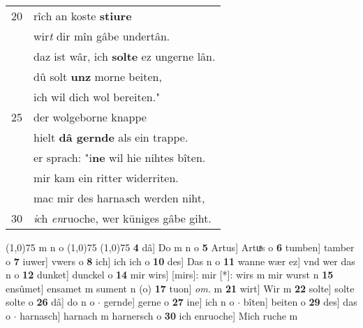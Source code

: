 \documentclass[8pt,a4paper,notitlepage]{article}
\begin{document}
\begin{table}[ht]
\begin{minipage}[t]{0.5\linewidth}
\begin{tabular}{rl}
20 & rîch an koste \textbf{stiure}\\ 
 & wir\textit{t} dir mîn gâbe undertân.\\ 
 & daz ist wâr, ich \textbf{solte} ez ungerne lân.\\ 
 & dû solt \textbf{unz} morne beiten,\\ 
 & ich wil dich wol bereiten."\\ 
25 & der wolgeborne knappe\\ 
 & hielt \textbf{dâ gernde} als ein trappe.\\ 
 & er sprach: "i\textbf{ne} wil hie nihtes bîten.\\ 
 & mir kam ein ritter widerriten.\\ 
 & mac mir des harna\textit{s}ch werden niht,\\ 
30 & \textit{i}ch \textit{en}ruoche, wer küniges gâbe giht.\\ 
\end{tabular}
\scriptsize
\line(1,0){75} \newline
m n o \newline
\line(1,0){75} \newline
\newline
\line(1,0){75} \newline
\textbf{4} dâ] Do m n o \textbf{5} Artus] Artuͯs o \textbf{6} tumben] tamber o \textbf{7} iuwer] vwers o \textbf{8} ich] ich ich o \textbf{10} des] Das n o \textbf{11} wanne wær ez] vnd wer das n o \textbf{12} dunket] dunckel o \textbf{14} mir wirs] [mirs]: mir [*]: wirs m mir wurst n \textbf{15} ensûmet] ensamet m sument n (o) \textbf{17} tuon] \textit{om.} m \textbf{21} wirt] Wir m \textbf{22} solte] solte solte o \textbf{26} dâ] do n o  $\cdot$ gernde] gerne o \textbf{27} ine] ich n o  $\cdot$ bîten] beiten o \textbf{29} des] das o  $\cdot$ harnasch] harnach m harnersch o \textbf{30} ich enruoche] Mich ruche m \newline
\end{minipage}
\end{table}
\newpage
\end{document}
